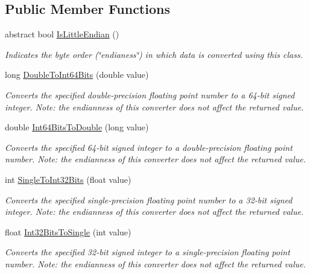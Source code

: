 \subsection*{Public Member Functions}
\begin{DoxyCompactItemize}
\item 
abstract bool \mbox{\hyperlink{class_t_net_1_1_i_o_1_1_endian_bit_converter_a0fe24cd850d8da0da9f75ef0467551cb}{Is\+Little\+Endian}} ()
\begin{DoxyCompactList}\small\item\em Indicates the byte order (\char`\"{}endianess\char`\"{}) in which data is converted using this class. \end{DoxyCompactList}\item 
long \mbox{\hyperlink{class_t_net_1_1_i_o_1_1_endian_bit_converter_ad7661c4bcea50caa14cd4d22110873a0}{Double\+To\+Int64\+Bits}} (double value)
\begin{DoxyCompactList}\small\item\em Converts the specified double-\/precision floating point number to a 64-\/bit signed integer. Note\+: the endianness of this converter does not affect the returned value. \end{DoxyCompactList}\item 
double \mbox{\hyperlink{class_t_net_1_1_i_o_1_1_endian_bit_converter_a33615ec4ba0c20f450b34599d76fcc7f}{Int64\+Bits\+To\+Double}} (long value)
\begin{DoxyCompactList}\small\item\em Converts the specified 64-\/bit signed integer to a double-\/precision floating point number. Note\+: the endianness of this converter does not affect the returned value. \end{DoxyCompactList}\item 
int \mbox{\hyperlink{class_t_net_1_1_i_o_1_1_endian_bit_converter_ac93b60f01cf809e9f290c3f4793f79cd}{Single\+To\+Int32\+Bits}} (float value)
\begin{DoxyCompactList}\small\item\em Converts the specified single-\/precision floating point number to a 32-\/bit signed integer. Note\+: the endianness of this converter does not affect the returned value. \end{DoxyCompactList}\item 
float \mbox{\hyperlink{class_t_net_1_1_i_o_1_1_endian_bit_converter_a6dfc6c331c6591940588f75d7a7e793e}{Int32\+Bits\+To\+Single}} (int value)
\begin{DoxyCompactList}\small\item\em Converts the specified 32-\/bit signed integer to a single-\/precision floating point number. Note\+: the endianness of this converter does not affect the returned value. \end{DoxyCompactList}\item 

\end{DoxyCompactItemize}
